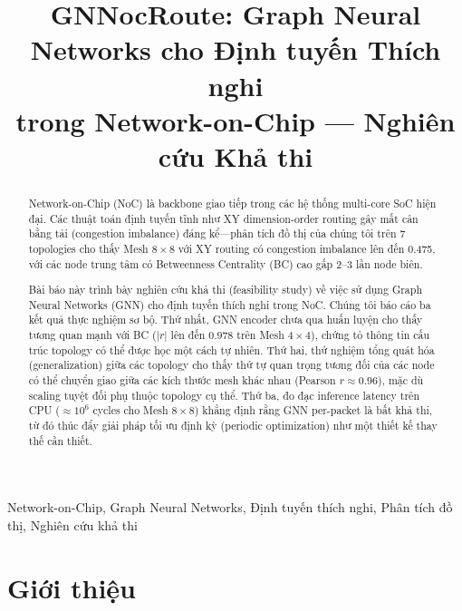 \documentclass[conference]{IEEEtran}
\begin{document}
\title{GNNocRoute: Graph Neural Networks cho Định tuyến Thích nghi\\trong Network-on-Chip — Nghiên cứu Khả thi}

\author{
}

\maketitle

\begin{abstract}
Network-on-Chip (NoC) là backbone giao tiếp trong các hệ thống multi-core SoC hiện đại.
Các thuật toán định tuyến tĩnh như XY dimension-order routing gây mất cân bằng tải
(congestion imbalance) đáng kể---phân tích đồ thị của chúng tôi trên 7 topologies cho thấy
Mesh $8\times8$ với XY routing có congestion imbalance lên đến 0.475,
với các node trung tâm có Betweenness Centrality (BC) cao gấp 2--3 lần node biên.

Bài báo này trình bày nghiên cứu khả thi (feasibility study) về việc sử dụng
Graph Neural Networks (GNN) cho định tuyến thích nghi trong NoC.
Chúng tôi báo cáo ba kết quả thực nghiệm sơ bộ.
Thứ nhất, GNN encoder chưa qua huấn luyện cho thấy tương quan mạnh với BC
($|r|$ lên đến 0.978 trên Mesh $4\times4$), chứng tỏ thông tin cấu trúc topology
có thể được học một cách tự nhiên. Thứ hai, thử nghiệm tổng quát hóa
(generalization) giữa các topology cho thấy thứ tự quan trọng tương đối
của các node có thể chuyển giao giữa các kích thước mesh khác nhau
(Pearson $r \approx 0.96$), mặc dù scaling tuyệt đối phụ thuộc topology cụ thể.
Thứ ba, đo đạc inference latency trên CPU ($\approx 10^6$ cycles cho Mesh $8\times8$)
khẳng định rằng GNN per-packet là bất khả thi, từ đó thúc đẩy giải pháp
tối ưu định kỳ (periodic optimization) như một thiết kế thay thế cần thiết.
\end{abstract}

\begin{IEEEkeywords}
Network-on-Chip, Graph Neural Networks, Định tuyến thích nghi, Phân tích đồ thị, Nghiên cứu khả thi
\end{IEEEkeywords}

\section{Giới thiệu}
\label{sec:intro}
\end{document}
